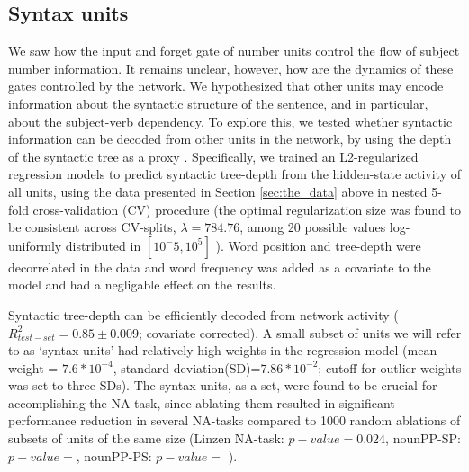 \subsection{Syntax units}
\label{sec:syntax-units}
We saw how the input and forget gate of number units control the flow
of subject number information. It remains unclear, however, how are
the dynamics of these gates controlled by the network. We hypothesized
that other units may encode information about the syntactic structure
of the sentence, and in particular, about the subject-verb
dependency. To explore this, we tested whether syntactic information
can be decoded from other units in the network, by using the depth of
the syntactic tree as a proxy \cite{Nelson:etal:2017}. Specifically,
we trained an L2-regularized regression models to predict
syntactic tree-depth from the hidden-state activity of all units,
using the data presented in Section \ref{sec:the_data} above in nested
5-fold cross-validation (CV) procedure (the optimal regularization size was found to be consistent across CV-splits, $\lambda=784.76$, among 20 possible values log-uniformly distributed in $[10^-5, 10^5]$ ). Word position and tree-depth were decorrelated in the data and word frequency was added as a covariate
to the model and had a negligable effect on the results.

Syntactic tree-depth can be efficiently decoded from network activity
($R^2_{test-set}=0.85\pm0.009$; covariate corrected). A small subset of units we will refer to
as `syntax units' had relatively high weights in the regression model (mean weight = $7.6*10^{-4}$, standard deviation(SD)=$7.86*10^{-2}$; cutoff for outlier weights was set to three SDs). The syntax
units, as a set, were found to be crucial for accomplishing the NA-task, since
ablating them resulted in significant performance reduction in several NA-tasks compared
to 1000 random ablations of subsets of units of the same size
(Linzen NA-task: $p-value=0.024$, nounPP-SP: $p-value=$, nounPP-PS: $p-value=$ ).


